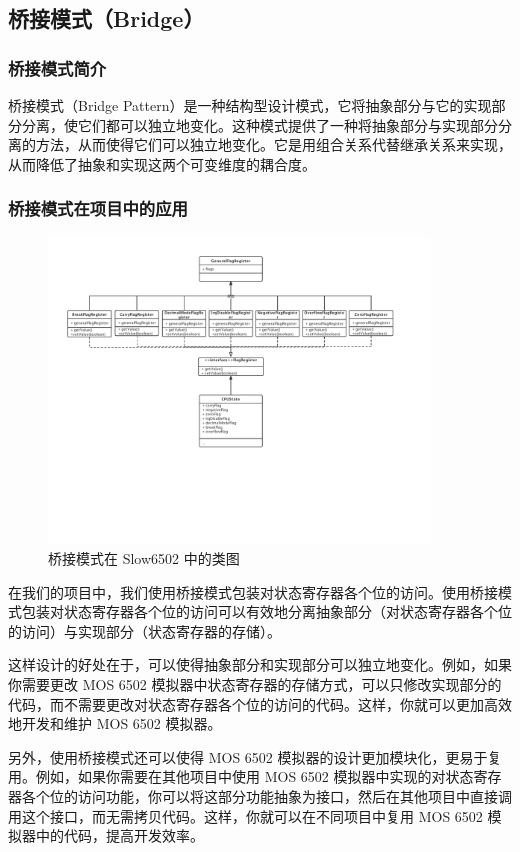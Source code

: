 \subsection{桥接模式（Bridge）}

\subsubsection{桥接模式简介}

桥接模式（Bridge Pattern）是一种结构型设计模式，它将抽象部分与它的实现部分分离，使它们都可以独立地变化。这种模式提供了一种将抽象部分与实现部分分离的方法，从而使得它们可以独立地变化。它是用组合关系代替继承关系来实现，从而降低了抽象和实现这两个可变维度的耦合度。

\subsubsection{桥接模式在项目中的应用}

\begin{figure}[h]
  \centering
  \includegraphics[width=0.9\textwidth]{figures/Bridge.pdf}
  \caption{桥接模式在 Slow6502 中的类图}
\end{figure}

在我们的项目中，我们使用桥接模式包装对状态寄存器各个位的访问。使用桥接模式包装对状态寄存器各个位的访问可以有效地分离抽象部分（对状态寄存器各个位的访问）与实现部分（状态寄存器的存储）。

这样设计的好处在于，可以使得抽象部分和实现部分可以独立地变化。例如，如果你需要更改 MOS 6502 模拟器中状态寄存器的存储方式，可以只修改实现部分的代码，而不需要更改对状态寄存器各个位的访问的代码。这样，你就可以更加高效地开发和维护 MOS 6502 模拟器。

另外，使用桥接模式还可以使得 MOS 6502 模拟器的设计更加模块化，更易于复用。例如，如果你需要在其他项目中使用 MOS 6502 模拟器中实现的对状态寄存器各个位的访问功能，你可以将这部分功能抽象为接口，然后在其他项目中直接调用这个接口，而无需拷贝代码。这样，你就可以在不同项目中复用 MOS 6502 模拟器中的代码，提高开发效率。
